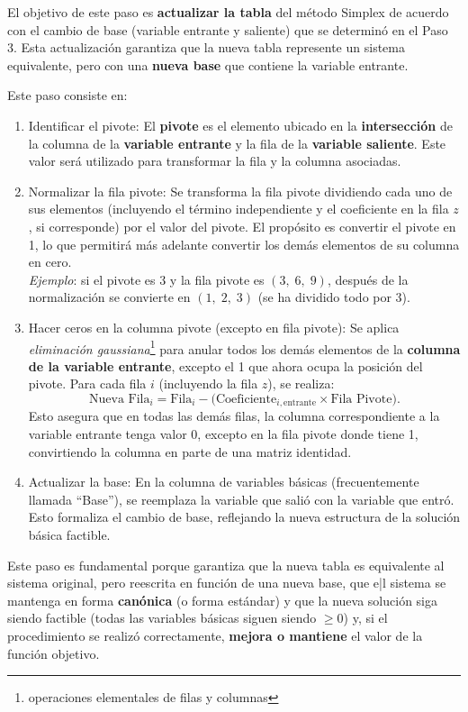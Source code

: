 El objetivo de este paso es \textbf{actualizar la tabla} del método Simplex de acuerdo con el cambio de base (variable entrante y saliente) que se determinó en el Paso 3. Esta actualización garantiza que la nueva tabla represente un sistema equivalente, pero con una \textbf{nueva base} que contiene la variable entrante.

Este paso consiste en:
\begin{enumerate}
  \item Identificar el pivote: El \textbf{pivote} es el elemento ubicado en la \textbf{intersección} de la columna de la \textbf{variable entrante} y la fila de la \textbf{variable saliente}. Este valor será utilizado para transformar la fila y la columna asociadas.

  \item Normalizar la fila pivote: Se transforma la fila pivote dividiendo cada uno de sus elementos (incluyendo el término independiente y el coeficiente en la fila \(z\), si corresponde) por el valor del pivote. El propósito es convertir el pivote en 1, lo que permitirá más adelante convertir los demás elementos de su columna en cero.\\ \emph{Ejemplo}: si el pivote es 3 y la fila pivote es \((3,\;6,\;9)\), después de la normalización se convierte en \((1,\;2,\;3)\) (se ha dividido todo por 3).

  \item Hacer ceros en la columna pivote (excepto en fila pivote): Se aplica \emph{eliminación gaussiana}\footnote{operaciones elementales de filas y columnas} para anular todos los demás elementos de la \textbf{columna de la variable entrante}, excepto el 1 que ahora ocupa la posición del pivote. Para cada fila \(i\) (incluyendo la fila \(z\)), se realiza:
    \[
      \text{Nueva Fila}_i
      = \text{Fila}_i
      - \bigl(\text{Coeficiente}_{i,\mathrm{entrante}} \times \text{Fila Pivote}\bigr).
    \]
  Esto asegura que en todas las demás filas, la columna correspondiente a la variable entrante tenga valor 0, excepto en la fila pivote donde tiene 1, convirtiendo la columna en parte de una matriz identidad.

  \item Actualizar la base: En la columna de variables básicas (frecuentemente llamada ``Base''), se reemplaza la variable que salió con la variable que entró. Esto formaliza el cambio de base, reflejando la nueva estructura de la solución básica factible.
\end{enumerate}
Este paso es fundamental porque garantiza que la nueva tabla es equivalente al sistema original, pero reescrita en función de una nueva base, que e|l sistema se mantenga en forma \textbf{canónica} (o forma estándar) y que la nueva solución siga siendo factible (todas las variables básicas siguen siendo \(\ge 0\)) y, si el procedimiento se realizó correctamente, \textbf{mejora o mantiene} el valor de la función objetivo.

